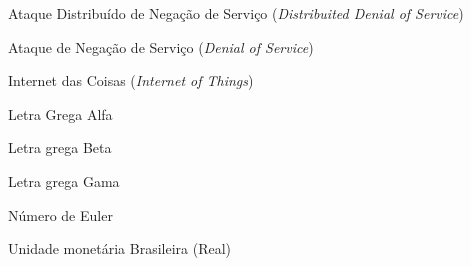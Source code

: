 \documentclass[
	12pt,		%
	a4paper,	%
	openright,  %
	oneside,	%
	chapter=TITLE,		%
	section=TITLE,		%
	english,	%
	brazilian   %
]{abntex2}
\begin{document}
%

\listoffigures*
\newpage

%

\listoftables*
\newpage

%
\begin{siglas}
  \item [DDoS] Ataque Distribuído de Negação de Serviço (\emph{Distribuited Denial of Service})
  \item [DoS] Ataque de Negação de Serviço (\emph{Denial of Service})
  \item [IoT]	Internet das Coisas (\emph{Internet of Things})
\end{siglas}

%
\begin{simbolos}
\item[$\alpha$] Letra Grega Alfa
\item[$\beta$] Letra grega Beta
\item[$\gamma$] Letra grega Gama
\item[$e$] Número de Euler
\item[R\$] Unidade monetária Brasileira (Real)
\end{simbolos}
\end{document}

